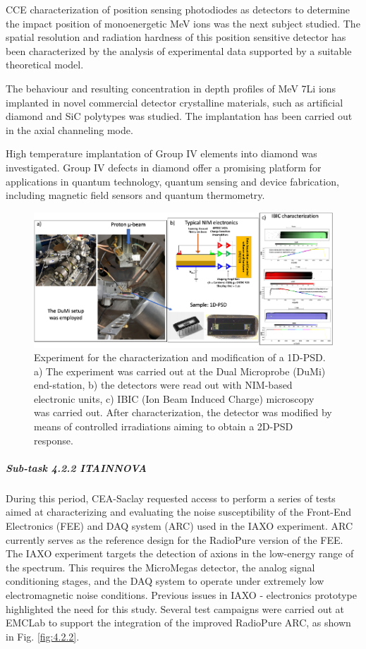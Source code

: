 CCE characterization of position sensing photodiodes as detectors to determine the impact position of monoenergetic MeV ions was the next subject studied. The spatial resolution and radiation hardness of this position sensitive detector has been characterized by the analysis of experimental data supported by a suitable theoretical model. 

The behaviour and resulting concentration in depth profiles of MeV 7Li ions implanted in novel commercial detector crystalline materials, such as artificial diamond and SiC polytypes was studied. The implantation has been carried out in the axial channeling mode. 

High temperature implantation of Group IV elements into diamond was investigated. Group IV defects in diamond offer a promising platform for applications in quantum technology, quantum sensing and device fabrication, including magnetic field sensors and quantum thermometry. 

\begin{figure} [!h]
    \centering
    \includegraphics[width=0.75\linewidth]{image4.png}
    \caption{Experiment for the characterization and modification of a 1D-PSD. a) The experiment was carried out at the Dual Microprobe (DuMi) end-station, b) the detectors were read out with NIM-based electronic units, c) IBIC (Ion Beam Induced Charge) microscopy was carried out. After characterization, the detector was modified by means of controlled irradiations aiming to obtain a 2D-PSD response.}
    \label{fig:4.2.1}
\end{figure}

\subparagraph{Sub-task 4.2.2 ITAINNOVA} \mbox{}

During this period, CEA-Saclay requested access to perform a series of tests aimed at characterizing and evaluating the noise susceptibility of the Front-End Electronics (FEE) and DAQ system (ARC) used in the IAXO experiment. ARC currently serves as the reference design for the RadioPure version of the FEE. The IAXO experiment targets the detection of axions in the low-energy range of the spectrum. This requires the MicroMegas detector, the analog signal conditioning stages, and the DAQ system to operate under extremely low electromagnetic noise conditions. Previous issues in IAXO - electronics prototype highlighted the need for this study. Several test campaigns were carried out at EMCLab to support the integration of the improved RadioPure ARC, as shown in Fig. \ref{fig:4.2.2}.

